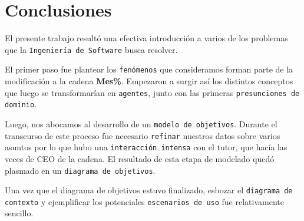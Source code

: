 
\section{Conclusiones}

El presente trabajo resultó una efectiva introducción a varios de los problemas
que la \texttt{Ingeniería de Software} busca resolver.

El primer paso fue plantear los \texttt{fenómenos} que consideramos forman parte
de la modificación a la cadena \textbf{Mes\%}. Empezaron a surgir así los
distintos conceptos que luego se transformarían en \texttt{agentes}, junto con
las primeras \texttt{presunciones de dominio}.

Luego, nos abocamos al desarrollo de un \texttt{modelo de objetivos}. Durante el
transcurso de este proceso fue necesario \texttt{refinar} nuestros datos sobre
varios asuntos por lo que hubo una \texttt{interacción intensa} con el tutor,
que hacía las veces de CEO de la cadena. El resultado de esta etapa de modelado
quedó plasmado en un \texttt{diagrama de objetivos}.

Una vez que el diagrama de objetivos estuvo finalizado, esbozar el
\texttt{diagrama de contexto} y ejemplificar los potenciales \texttt{escenarios
de uso} fue relativamente sencillo.
